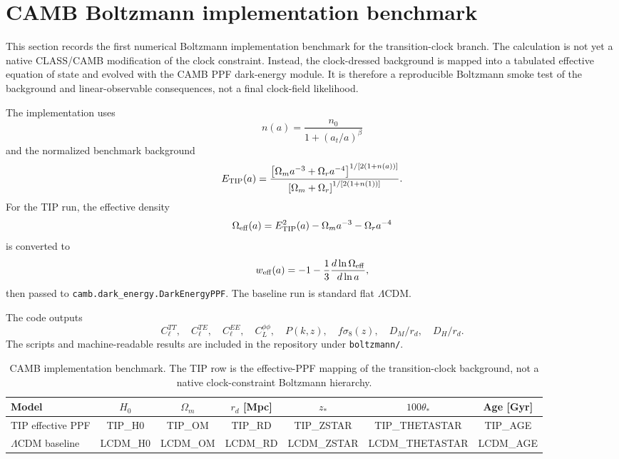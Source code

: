 \section{CAMB Boltzmann implementation benchmark}
\label{sec:camb-boltzmann-benchmark}

This section records the first numerical Boltzmann implementation benchmark for the transition-clock branch. The calculation is not yet a native CLASS/CAMB modification of the clock constraint. Instead, the clock-dressed background is mapped into a tabulated effective equation of state and evolved with the CAMB PPF dark-energy module. It is therefore a reproducible Boltzmann smoke test of the background and linear-observable consequences, not a final clock-field likelihood.

The implementation uses
\begin{equation}
 n(a)=\frac{n_0}{1+(a_t/a)^\beta}
\end{equation}
and the normalized benchmark background
\begin{equation}
 E_{\rm TIP}(a)=
 \frac{\left[\Omega_m a^{-3}+\Omega_r a^{-4}\right]^{1/[2(1+n(a))]}}
 {\left[\Omega_m+\Omega_r\right]^{1/[2(1+n(1))]}} .
\end{equation}
For the TIP run, the effective density
\begin{equation}
 \Omega_{\rm eff}(a)=E_{\rm TIP}^2(a)-\Omega_m a^{-3}-\Omega_r a^{-4}
\end{equation}
is converted to
\begin{equation}
 w_{\rm eff}(a)=-1-\frac{1}{3}\frac{d\ln\Omega_{\rm eff}}{d\ln a},
\end{equation}
then passed to \texttt{camb.dark\_energy.DarkEnergyPPF}. The baseline run is standard flat $\Lambda$CDM.

The code outputs
\begin{equation}
 C_\ell^{TT},\quad C_\ell^{TE},\quad C_\ell^{EE},\quad C_L^{\phi\phi},\quad
 P(k,z),\quad f\sigma_8(z),\quad D_M/r_d,\quad D_H/r_d .
\end{equation}
The scripts and machine-readable results are included in the repository under \texttt{boltzmann/}.

\begin{table}[t]
\caption{CAMB implementation benchmark. The TIP row is the effective-PPF mapping of the transition-clock background, not a native clock-constraint Boltzmann hierarchy.}
\label{tab:camb-implementation-benchmark}
\begin{ruledtabular}
\begin{tabular}{lcccccc}
Model & $H_0$ & $\Omega_m$ & $r_d$ [Mpc] & $z_\ast$ & $100\theta_\ast$ & Age [Gyr]\\
\hline
TIP effective PPF & TIP_H0 & TIP_OM & TIP_RD & TIP_ZSTAR & TIP_THETASTAR & TIP_AGE\\
$\Lambda$CDM baseline & LCDM_H0 & LCDM_OM & LCDM_RD & LCDM_ZSTAR & LCDM_THETASTAR & LCDM_AGE
\end{tabular}
\end{ruledtabular}
\end{table}

